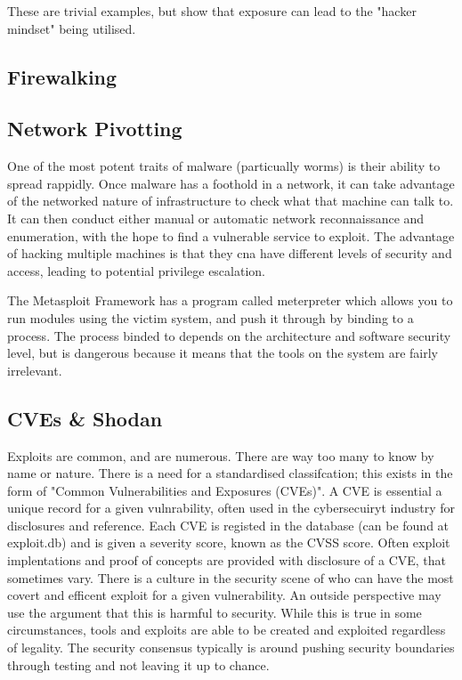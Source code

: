 These are trivial examples, but show that exposure can lead to the "hacker mindset" being utilised.


\subsection{Firewalking}

\subsection{Network Pivotting}
One of the most potent traits of malware (particually worms) is their ability to spread rappidly. Once malware has a foothold in a network, it can take advantage of the networked nature of infrastructure to check what that machine can talk to.
It can then conduct either manual or automatic network reconnaissance and enumeration, with the hope to find a vulnerable service to exploit. The advantage of hacking multiple machines is that they cna have different levels of security and access, 
leading to potential privilege escalation. 

The Metasploit Framework has a program called meterpreter which allows you to run modules using the victim system, and push it through by binding to a process. The process binded to depends on the architecture and software security level, but is dangerous
because it means that the tools on the system are fairly irrelevant. 

\subsection{CVEs \& Shodan}
Exploits are common, and are numerous. There are way too many to know by name or nature. There is a need for a standardised classifcation; this exists in the form of "Common Vulnerabilities and Exposures (CVEs)". A CVE is essential a unique record for a given vulnrability,
often used in the cybersecuiryt industry for disclosures and reference. Each CVE is registed in the database (can be found at exploit.db) and is given a severity score, known as the CVSS score. Often exploit implentations and proof of concepts are provided with disclosure of a CVE, that sometimes vary.
There is a culture in the security scene of who can have the most covert and efficent exploit for a given vulnerability. An outside perspective may use the argument that this is harmful to security. While this is true in some circumstances, tools and exploits are able to be created and exploited regardless of legality.
The security consensus typically is around pushing security boundaries through testing and not leaving it up to chance. 

